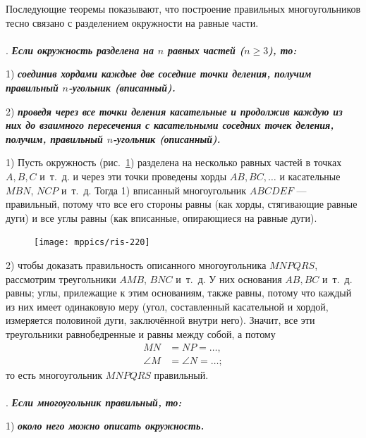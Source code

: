 \documentclass[oneside]{book}
\begin{document}
Последующие теоремы показывают, что построение правильных многоугольников тесно связано с разделением окружности на равные части.

\paragraph{}\label{1938/213}
.
\textbf{\emph{Если окружность разделена на $n$ равных частей ($n\ge 3$), то:}}

1) \textbf{\emph{соединив хордами каждые две соседние точки деления, получим правильный $n$-угольник (вписанный).}}

2) \textbf{\emph{проведя через все точки деления касательные и продолжив каждую из них до взаимного пересечения с касательными соседних точек деления, получим, правильный $n$-угольник (описанный).}}


1) Пусть окружность (рис.~\ref{1938/ris-220}) разделена на несколько равных частей в точках $A, B, C$ и~т.~д.
и через эти точки проведены хорды $AB, BC,\dots$
и касательные $MBN$, $NCP$ и~т.~д.
Тогда 1) вписанный многоугольник $ABCDEF$ — правильный, потому что все его стороны равны (как хорды, стягивающие равные дуги) и все углы равны (как вписанные, опирающиеся на равные дуги).

\begin{figure}
\centering
\texttt{[image: mppics/ris-220]}
\caption{}\label{1938/ris-220}
\end{figure}

2) чтобы доказать правильность описанного многоугольника $MNPQRS$, рассмотрим треугольники $AMB$, $BNC$ и~т.~д.
У них основания $AB, BC$ и~т.~д.
равны;
углы, прилежащие к этим основаниям, также равны, потому что каждый из них имеет одинаковую меру (угол, составленный касательной и хордой, измеряется половиной дуги, заключённой внутри него).
Значит, все эти треугольники равнобедренные и равны между собой, а потому 
\begin{align*}
MN&=NP=\dots,
\\
\angle M&=\angle N=\dots;
\end{align*}
то есть многоугольник $MNPQRS$ правильный.

\paragraph{}\label{1938/215}
.
\textbf{\emph{Если многоугольник правильный, то:}}

1) \textbf{\emph{около него можно описать окружность.}}
\end{document}
